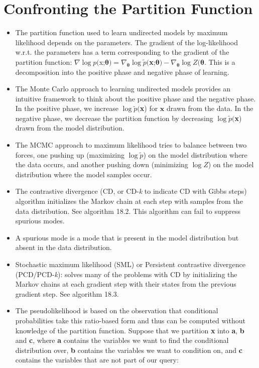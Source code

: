 \documentclass{article}
\begin{document}
\section{Confronting the Partition Function}
\begin{itemize}
\item The partition function used to learn undirected models by maximum likelihood depends on the parameters. The gradient of the log-likelihood w.r.t. the parameters has a term corresponding to the gradient of the partition function: \(\nabla \log p(\)\textbf{}{x};\(\boldsymbol{\theta}) = \nabla_{\boldsymbol{\theta}} \log \tilde{p}(\)\textbf{x};\(\boldsymbol{\theta}) - \nabla_{\boldsymbol{\theta}} \log  Z(\boldsymbol{\theta}\). This is a decomposition into the positive phase and negative phase of learning.
\item The Monte Carlo approach to learning undirected models provides an intuitive framework to think about the positive phase and the negative phase. In the positive phase, we increase \(\log \tilde{p}(\)\textbf{x}) for \(\boldsymbol{x}\) drawn from the data. In the negative phase, we decrease the partition function by decreasing \(\log \tilde{p}(\)\textbf{x}) drawn from the model distribution.
\item The MCMC approach to maximum likelihood tries to balance between two forces, one pushing up (maximizing \(\log \tilde{p}\)) on the model distribution where the data occurs, and another pushing down (minimizing \(\log Z\)) on the model distribution where the model samples occur.
\item The contrastive divergence (CD, or CD-\textit{k} to indicate CD with Gibbs steps) algorithm initializes the Markov chain at each step with samples from the data distribution. See algorithm 18.2. This algorithm can fail to suppress spurious modes.
\item A spurious mode is a mode that is present in the model distribution but absent in the data distribution.
\item Stochastic maximum likelihood (SML) or Persistent contrastive divergence (PCD/PCD-\textit{k}): solves many of the problems with CD by initializing the Markov chains at each gradient step with their states from the previous gradient step. See algorithm 18.3.
\item The pseudolikelihood is based on the observation that conditional probabilities take this ratio-based form and thus can be computed without knowledge of the partition function. Suppose that we partition \textbf{x} into \textbf{a}, \textbf{b} and \textbf{c}, where \textbf{a} contains the variables we want to find the conditional distribution over, \textbf{b} contains the variables we want to condition on, and \textbf{c} contains the variables that are not part of our query: 

\end{itemize}
\end{document}
